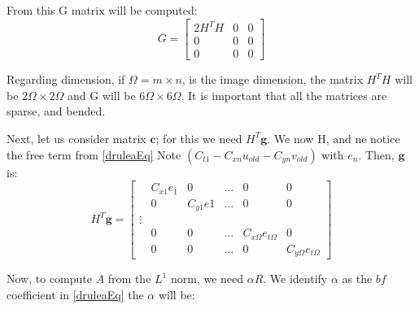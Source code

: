 \documentclass[12pt,a4paper,twoside]{report}
\begin{document}
{From this G matrix will be computed:
\begin{equation}
	G = \begin{bmatrix}
		2H^TH & 0 & 0\\
		0 & 0 & 0 \\
		0 & 0& 0
	\end{bmatrix}
\end{equation}

Regarding dimension, if $\Omega = m\times n$, is the image dimension, the matrix $H^TH$ will be $2\Omega \times 2 \Omega$ and G will be $6\Omega \times 6 \Omega$. It is important that all the matrices are sparse, and bended. 

Next, let us consider matrix $\boldsymbol{c}$; for this we need $H^T\boldsymbol{g}$. We now H, and ne notice the free term from \ref{druleaEq} Note $(C_{t1} - C_{xn}u_{old} - C_{yn}v_{old})$  with $e_n$. Then, $\boldsymbol{g}$ is:
$$
H^T \boldsymbol{g} = 
\begin{bmatrix}
& C_{x1}e_1 & 0 &\ldots & 0 & 0 \\ 
& 0 &  C_{y1}e1 &\ldots & 0  & 0\\
\vdots \\
& 0 & 0 &\ldots &  C_{x\Omega}e_{t\Omega}   & 0\\
& 0 & 0 &\ldots & 0 & C_{y\Omega}e_{t\Omega} 
\end{bmatrix}
$$

Now, to compute $A$ from the $L^1$ norm, we need $\alpha R$. We identify $\alpha$ as the $bf$ coefficient in \ref{druleaEq}
the  $\alpha$ will be:

}
\end{document}

